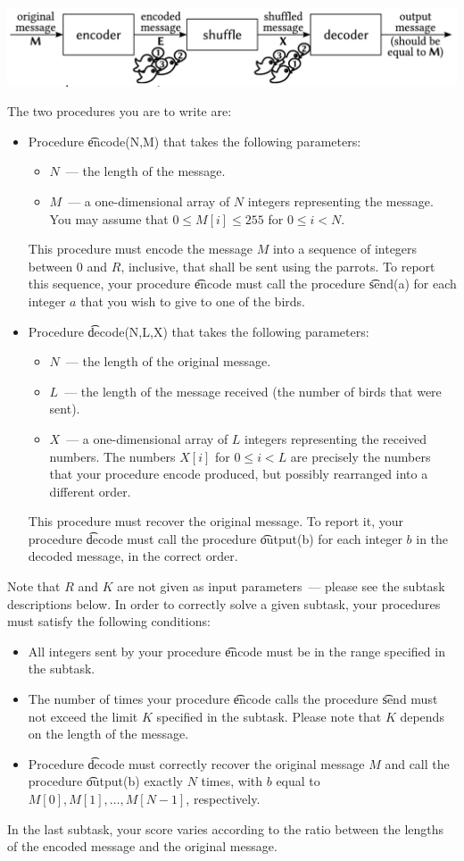 \includegraphics[width=175mm]{parrots1.png}

The two procedures you are to write are:
\begin{itemize}
\item Procedure \t{encode(N,M)} that takes the following parameters:
\begin{itemize}
\item $N$~--- the length of the message.
\item $M$~--- a one-dimensional array of $N$ integers representing the message. You may assume that $0 \leq M[i] \leq 255$ for $0 \leq i < N$.
\end{itemize}
This procedure must encode the message $M$ into a sequence of integers between $0$ and $R$,
inclusive, that shall be sent using the parrots. To report this sequence, your procedure
\t{encode} must call the procedure \t{send(a)} for each integer $a$ that you wish to give to one of
the birds.
\item Procedure \t{decode(N,L,X)} that takes the following parameters:
\begin{itemize}
\item $N$~--- the length of the original message.
\item $L$~--- the length of the message received (the number of birds that were sent).
\item $X$~--- a one-dimensional array of $L$ integers representing the received numbers. The
numbers $X[i]$ for $0 \leq i < L$ are precisely the numbers that your procedure encode
produced, but possibly rearranged into a different order.
\end{itemize}
This procedure must recover the original message. To report it, your procedure \t{decode}
must call the procedure \t{output(b)} for each integer $b$ in the decoded message, in the correct order.
\end{itemize}
Note that $R$ and $K$ are not given as input parameters~--- please see the subtask descriptions below.
In order to correctly solve a given subtask, your procedures must satisfy the following conditions:
\begin{itemize}
\item All integers sent by your procedure \t{encode} must be in the range specified in the subtask.
\item The number of times your procedure \t{encode} calls the procedure \t{send} must not exceed
the limit $K$ specified in the subtask. Please note that $K$ depends on the length of the message.
\item Procedure \t{decode} must correctly recover the original message $M$ and call the procedure
\t{output(b)} exactly $N$ times, with $b$ equal to $M[0], M[1], \dots, M[N-1]$, respectively.
\end{itemize}
In the last subtask, your score varies according to the ratio between the lengths of the encoded
message and the original message.

